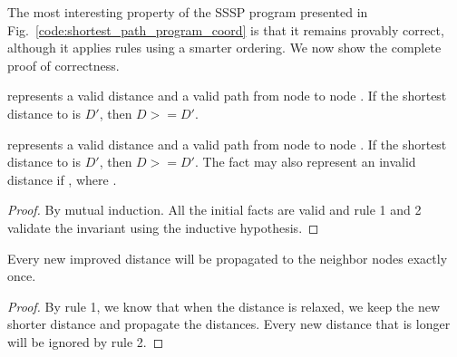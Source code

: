 The most interesting property of the SSSP program presented in
Fig.~\ref{code:shortest_path_program_coord} is that it remains provably correct,
although it applies rules using a smarter ordering. We now show the complete
proof of correctness.

\begin{invariant}[Distance]

 represents a valid distance  and a valid path
 from node  to node . If the shortest distance to
 is $D'$, then $D >= D'$.

 represents a valid distance  and a valid
path  from node  to node . If the shortest
distance to  is $D'$, then $D >= D'$. The  fact may
also represent an invalid distance if , where .

\end{invariant}

\begin{proof}
By mutual induction. All the initial facts are valid and rule 1 and 2 validate the
invariant using the inductive hypothesis.
\end{proof}

\begin{lemma}[Relaxation]
Every new improved distance will be propagated to the neighbor nodes exactly once.
\end{lemma}
\begin{proof}
By rule 1, we know that when the distance is relaxed, we keep the new shorter
distance and propagate the distances. Every new distance that is longer will be
ignored by rule 2.
\end{proof}

